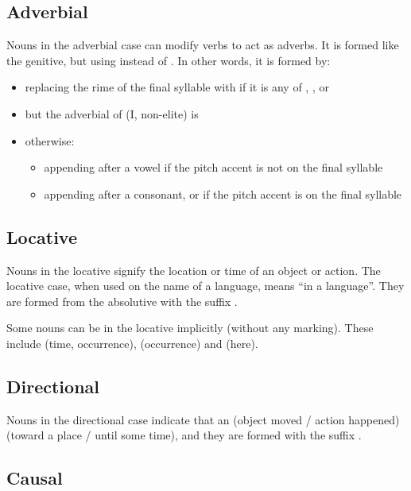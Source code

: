 \documentclass{book}
\begin{document}
\subsection{Adverbial}

Nouns in the adverbial case can modify verbs to act as adverbs. It is formed like the genitive, but using  instead of . In other words, it is formed by:

\begin{itemize}
    \item replacing the rime of the final syllable with  if it is any of , ,  or 
    \item but the adverbial of  (I, non-elite) is 
    \item otherwise:
    \begin{itemize}
        \item appending  after a vowel if the pitch accent is not on the final syllable
        \item appending  after a consonant, or if the pitch accent is on the final syllable
    \end{itemize}
\end{itemize}

\subsection{Locative}

Nouns in the locative signify the location or time of an object or action. The locative case, when used on the name of a language, means ``in a language''. They are formed from the absolutive with the suffix .

Some nouns can be in the locative implicitly (without any marking). These include  (time, occurrence),  (occurrence) and  (here).

\subsection{Directional}

Nouns in the directional case indicate that an (object moved / action happened) (toward a place / until some time), and they are formed with the suffix .

\subsection{Causal}
\end{document}
